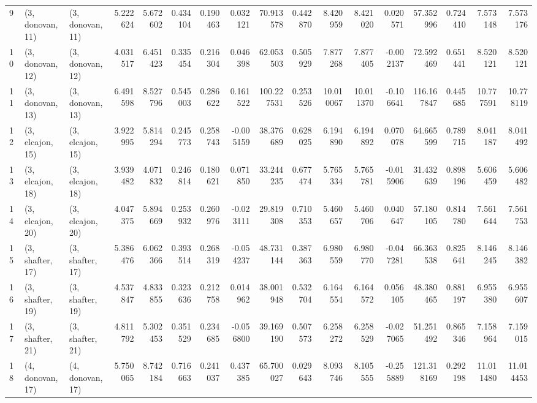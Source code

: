 \begin{tabular}{lllrrrrrrrrrrrrrr}
9  &  (3, donovan, 11) &  (3, donovan, 11) &  5.222624 &  5.672602 &   0.434104 &  0.190463 &  0.032121 &   70.913578 &  0.442870 &   8.420959 &   8.421020 &  0.020571 &   57.352996 &  0.724410 &   7.573148 &   7.573176 \\
10 &  (3, donovan, 12) &  (3, donovan, 12) &  4.031517 &  6.451423 &   0.335454 &  0.216304 &  0.046398 &   62.053503 &  0.505929 &   7.877268 &   7.877405 & -0.002137 &   72.592469 &  0.651441 &   8.520121 &   8.520121 \\
11 &  (3, donovan, 13) &  (3, donovan, 13) &  6.491598 &  8.527796 &   0.545003 &  0.286622 &  0.161522 &  100.227531 &  0.253526 &  10.010067 &  10.011370 & -0.106641 &  116.167847 &  0.445685 &  10.777591 &  10.778119 \\
12 &  (3, elcajon, 15) &  (3, elcajon, 15) &  3.922995 &  5.814294 &   0.245773 &  0.258743 & -0.005159 &   38.376689 &  0.628025 &   6.194890 &   6.194892 &  0.070078 &   64.665599 &  0.789715 &   8.041187 &   8.041492 \\
13 &  (3, elcajon, 18) &  (3, elcajon, 18) &  3.939482 &  4.071832 &   0.246814 &  0.180621 &  0.071850 &   33.244235 &  0.677474 &   5.765334 &   5.765781 & -0.015906 &   31.432639 &  0.898196 &   5.606459 &   5.606482 \\
14 &  (3, elcajon, 20) &  (3, elcajon, 20) &  4.047375 &  5.894669 &   0.253932 &  0.260976 & -0.023111 &   29.819308 &  0.710353 &   5.460657 &   5.460706 &  0.040647 &   57.180105 &  0.814780 &   7.561644 &   7.561753 \\
15 &  (3, shafter, 17) &  (3, shafter, 17) &  5.386476 &  6.062366 &   0.393514 &  0.268319 & -0.054237 &   48.731144 &  0.387363 &   6.980559 &   6.980770 & -0.047281 &   66.363538 &  0.825641 &   8.146245 &   8.146382 \\
16 &  (3, shafter, 19) &  (3, shafter, 19) &  4.537847 &  4.833855 &   0.323636 &  0.212758 &  0.014962 &   38.001948 &  0.532704 &   6.164554 &   6.164572 &  0.056105 &   48.380465 &  0.881197 &   6.955380 &   6.955607 \\
17 &  (3, shafter, 21) &  (3, shafter, 21) &  4.811792 &  5.302453 &   0.351529 &  0.234685 & -0.056800 &   39.169190 &  0.507573 &   6.258272 &   6.258529 & -0.027065 &   51.251492 &  0.865346 &   7.158964 &   7.159015 \\
18 &  (4, donovan, 17) &  (4, donovan, 17) &  5.750065 &  8.742184 &   0.716663 &  0.241037 &  0.437385 &   65.700027 &  0.029643 &   8.093746 &   8.105555 & -0.255889 &  121.318169 &  0.292198 &  11.011480 &  11.014453 \\

\end{tabular}

